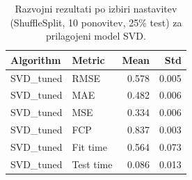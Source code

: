 \begin{table}[h]
\centering
\caption{Razvojni rezultati po izbiri nastavitev (ShuffleSplit, 10 ponovitev, 25\% test) za prilagojeni model SVD.}
\label{tab:cv_results_tuned_svd}
\begin{tabular}{llrr}
\toprule
Algorithm & Metric & Mean & Std \\
\midrule
SVD\_tuned & RMSE & 0.578 & 0.005 \\
SVD\_tuned & MAE & 0.482 & 0.006 \\
SVD\_tuned & MSE & 0.334 & 0.006 \\
SVD\_tuned & FCP & 0.837 & 0.003 \\
SVD\_tuned & Fit time & 0.564 & 0.073 \\
SVD\_tuned & Test time & 0.086 & 0.013 \\
\bottomrule
\end{tabular}

\end{table}
